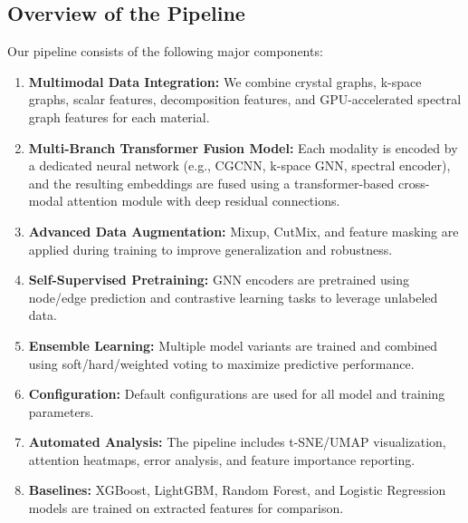 \documentclass[12pt]{article}
\begin{document}
\subsection{Overview of the Pipeline}
Our pipeline consists of the following major components:
\begin{enumerate}[label=\arabic*.]
    \item \textbf{Multimodal Data Integration:} We combine crystal graphs, k-space graphs, scalar features, decomposition features, and GPU-accelerated spectral graph features for each material.
    \item \textbf{Multi-Branch Transformer Fusion Model:} Each modality is encoded by a dedicated neural network (e.g., CGCNN, k-space GNN, spectral encoder), and the resulting embeddings are fused using a transformer-based cross-modal attention module with deep residual connections.
    \item \textbf{Advanced Data Augmentation:} Mixup, CutMix, and feature masking are applied during training to improve generalization and robustness.
    \item \textbf{Self-Supervised Pretraining:} GNN encoders are pretrained using node/edge prediction and contrastive learning tasks to leverage unlabeled data.
    \item \textbf{Ensemble Learning:} Multiple model variants are trained and combined using soft/hard/weighted voting to maximize predictive performance.
    \item \textbf{Configuration:} Default configurations are used for all model and training parameters.
    \item \textbf{Automated Analysis:} The pipeline includes t-SNE/UMAP visualization, attention heatmaps, error analysis, and feature importance reporting.
    \item \textbf{Baselines:} XGBoost, LightGBM, Random Forest, and Logistic Regression models are trained on extracted features for comparison.
\end{enumerate}
\end{document}
